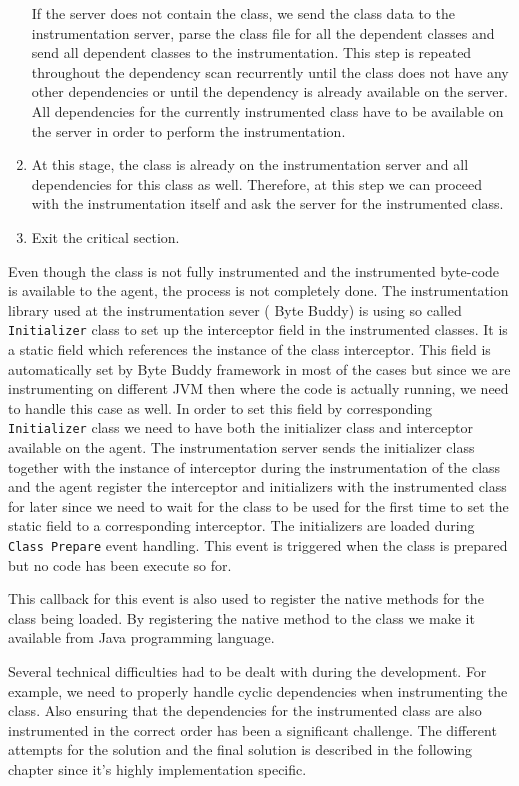 \begin{enumerate}
	If the server does not contain the class, we send the class data to the instrumentation server, parse the class file for all the dependent classes and send all dependent classes to the instrumentation. This step is repeated throughout the dependency scan recurrently until the class does not have any other dependencies or until the dependency is already available on the server. All dependencies for the currently instrumented class have to be available on the server in order to perform the instrumentation.

	\item At this stage, the class is already on the instrumentation server and all dependencies for this class as well. Therefore, at this step we can proceed with the instrumentation itself and ask the server for the instrumented class.
	\item Exit the critical section.
\end{enumerate}	
Even though the class is not fully instrumented and the instrumented byte-code is available to the agent, the process is not completely done. The instrumentation library used at the instrumentation sever ( Byte Buddy) is using so called \texttt{Initializer} class to set up the interceptor field in the instrumented classes. It is a static field which references the instance of the class interceptor. This field is automatically set by Byte Buddy framework in most of the cases but since we are instrumenting on different JVM then where the code is actually running, we need to handle this case as well. In order to set this field by corresponding \texttt{Initializer} class we need to have both the initializer class and interceptor available on the agent. The instrumentation server sends the initializer class together with the instance of interceptor during the instrumentation of the class and the agent register the interceptor and initializers with the instrumented class for later since we need to wait for the class to be used for the first time to set the static field to a corresponding interceptor. The initializers are loaded during  \texttt{Class Prepare} event handling. This event is triggered when the class is prepared but no code has been execute so for. 

This callback for this event is also used to register the native methods for the class being loaded. By registering the native method to the class we make it available from Java programming language.

Several technical difficulties had to be dealt with during the development. For example, we need to properly handle cyclic dependencies when instrumenting the class. Also ensuring that the dependencies for the instrumented class are also instrumented in the correct order has been a significant challenge. The different attempts for the solution and the final solution is described in the following chapter since it's highly implementation specific.
